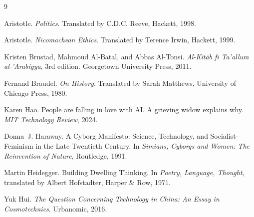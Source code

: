 \documentclass[12pt,a4paper]{article}
\begin{document}

\begin{thebibliography}{9}

Aristotle.
\newblock \emph{Politics}.
\newblock Translated by C.D.C. Reeve, Hackett, 1998.

Aristotle.
\newblock \emph{Nicomachean Ethics}.
\newblock Translated by Terence Irwin, Hackett, 1999.

Kristen Brustad, Mahmoud Al-Batal, and Abbas Al-Tonsi.
\newblock \emph{Al-Kit\={a}b f\={\i} Ta'allum al-'Arabiyya}, 3rd edition.
\newblock Georgetown University Press, 2011.

Fernand Braudel.
\newblock \emph{On History}.
\newblock Translated by Sarah Matthews, University of Chicago Press, 1980.

Karen Hao.
\newblock People are falling in love with AI\@. A grieving widow explains why.
\newblock \emph{MIT Technology Review}, 2024.

Donna~J. Haraway.
\newblock A Cyborg Manifesto: Science, Technology, and Socialist-Feminism in the Late Twentieth Century.
\newblock In \emph{Simians, Cyborgs and Women: The Reinvention of Nature}, Routledge, 1991.

Martin Heidegger.
\newblock Building Dwelling Thinking.
\newblock In \emph{Poetry, Language, Thought}, translated by Albert Hofstadter, Harper \& Row, 1971.

Yuk Hui.
\newblock \emph{The Question Concerning Technology in China: An Essay in Cosmotechnics}.
\newblock Urbanomic, 2016.

\end{thebibliography}
\end{document}
